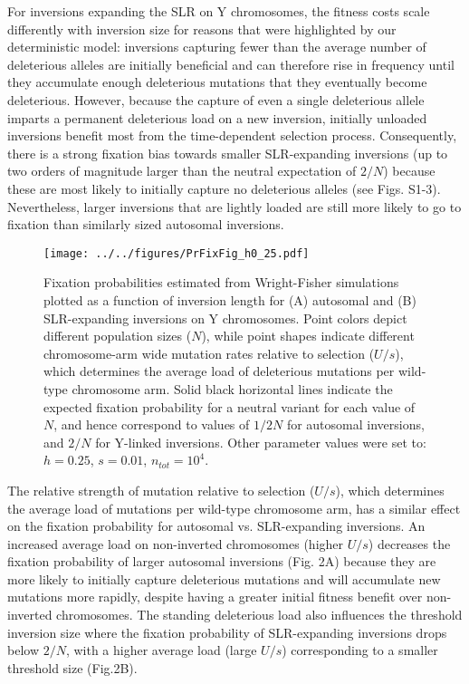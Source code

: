 \documentclass[11pt]{article}
\begin{document}
For inversions expanding the SLR on Y chromosomes, the fitness costs scale differently with inversion size for reasons that were highlighted by our deterministic model: inversions capturing fewer than the average number of deleterious alleles are initially beneficial and can therefore rise in frequency until they accumulate enough deleterious mutations that they eventually become deleterious. However, because the capture of even a single deleterious allele imparts a permanent deleterious load on a new inversion, initially unloaded inversions benefit most from the time-dependent selection process. Consequently, there is a strong fixation bias towards smaller SLR-expanding inversions (up to two orders of magnitude larger than the neutral expectation of $2/N$) because these are most likely to initially capture no deleterious alleles (see Figs. S1-3). Nevertheless, larger inversions that are lightly loaded are still more likely to go to fixation than similarly sized autosomal inversions. 


 \begin{figure}[htbp] \label{fig:WF-fig}
 \centering
 \texttt{[image: ../../figures/PrFixFig\_h0\_25.pdf]}
 \caption{\footnotesize{Fixation probabilities estimated from Wright-Fisher simulations plotted as a function of inversion length for (A) autosomal and (B) SLR-expanding inversions on Y chromosomes. Point colors depict different population sizes ($N$), while point shapes indicate different chromosome-arm wide mutation rates relative to selection ($U/s$), which determines the average load of deleterious mutations per wild-type chromosome arm. Solid black horizontal lines indicate the expected fixation probability for a neutral variant for each value of $N$, and hence correspond to values of $1/2N$ for autosomal inversions, and $2/N$ for Y-linked inversions. Other parameter values were set to: $h = 0.25$, $s = 0.01$, $n_{tot} = 10^4$.}}
 \end{figure}

The relative strength of mutation relative to selection ($U/s$), which determines the average load of mutations per wild-type chromosome arm, has a similar effect on the fixation probability for autosomal vs. SLR-expanding inversions. An increased average load on non-inverted chromosomes (higher $U/s$) decreases the fixation probability of larger autosomal inversions (Fig. 2A) because they are more likely to initially capture deleterious mutations and will accumulate new mutations more rapidly, despite having a greater initial fitness benefit over non-inverted chromosomes. The standing deleterious load also influences the threshold inversion size where the fixation probability of SLR-expanding inversions drops below $2/N$, with a higher average load (large $U/s$) corresponding to a smaller threshold size (Fig.2B). 
\end{document}
